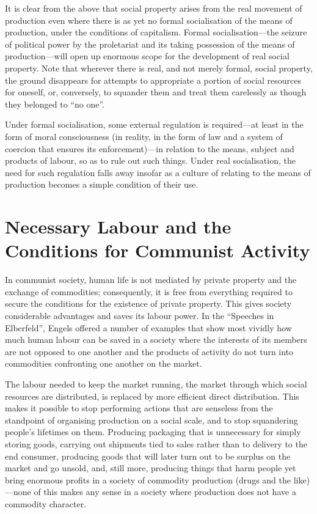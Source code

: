 \documentclass[12pt,a4paper,openany]{book}
\begin{document}
It is clear from the above that social property arises from the real movement of production even where there is as yet no formal socialisation of the means of production, under the conditions of capitalism. Formal socialisation—the seizure of political power by the proletariat and its taking possession of the means of production—will open up enormous scope for the development of real social property. Note that wherever there is real, and not merely formal, social property, the ground disappears for attempts to appropriate a portion of social resources for oneself, or, conversely, to squander them and treat them carelessly as though they belonged to “no one”.

Under formal socialisation, some external regulation is required—at least in the form of moral consciousness (in reality, in the form of law and a system of coercion that ensures its enforcement)—in relation to the means, subject and products of labour, so as to rule out such things. Under real socialisation, the need for such regulation falls away insofar as a culture of relating to the means of production becomes a simple condition of their use.
\ifSubfilesClassLoaded{\setcounter{page}{36}}{}
\section{Necessary Labour and the Conditions for Communist Activity}
\label{sec:06_necessary_labour}

In communist society, human life is not mediated by private property and the exchange of commodities; consequently, it is free from everything required to secure the conditions for the existence of private property. This gives society considerable advantages and saves its labour power. In the “Speeches in Elberfeld”, Engels offered a number of examples that show most vividly how much human labour can be saved in a society where the interests of its members are not opposed to one another and the products of activity do not turn into commodities confronting one another on the market.

The labour needed to keep the market running, the market through which social resources are distributed, is replaced by more efficient direct distribution. This makes it possible to stop performing actions that are senseless from the standpoint of organising production on a social scale, and to stop squandering people’s lifetimes on them. Producing packaging that is unnecessary for simply storing goods, carrying out shipments tied to sales rather than to delivery to the end consumer, producing goods that will later turn out to be surplus on the market and go unsold, and, still more, producing things that harm people yet bring enormous profits in a society of commodity production (drugs and the like)—none of this makes any sense in a society where production does not have a commodity character.
\end{document}
